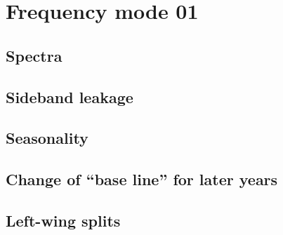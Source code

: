 \section{Frequency mode 01}
\subsection{Spectra}

\subsection{Sideband leakage}

\subsection{Seasonality}
\subsection{Change of ``base line'' for later years}

\subsection{Left-wing splits}
